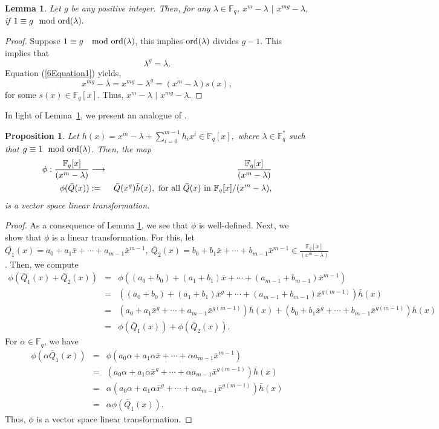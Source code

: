 \documentclass[12pt]{article}
\newtheorem{proposition}{Proposition}
\newtheorem{lemma}{Lemma}
\begin{document}
\begin{lemma}\label{6Lemma1}
	Let $g$ be any positive integer. Then, for any $\lambda \in \mathbb{F}_q$, $x^m- \lambda$ $|$ $x^{mg}-\lambda$, if $1\equiv g\mod \textup{ord}(\lambda).$
\end{lemma}
\begin{proof}
	Suppose $1\equiv g~\mod  \textup{ord}(\lambda)$, this implies $ \textup{ord}(\lambda)$ divides $g-1$. This implies that 
	\begin{equation}\label{6Equation1}
		\lambda^g=\lambda.
	\end{equation}
	Equation (\ref{6Equation1}) yields,
	$$x^{mg}-\lambda=x^{mg}-\lambda^g=(x^m-\lambda)s(x),$$
	for some $s(x)\in \mathbb{F}_q[x].$ Thus, $x^m- \lambda$ $|$ $x^{mg}-\lambda$.
\end{proof}
In light of Lemma~\ref{6Lemma1}, we present an analogue of \cite[Proposition 2]{cauchois2019circulant}.
\begin{proposition}\label{6Proposition1}
	Let $h(x)=x^m-\lambda+\sum_{i=0}^{m-1}h_ix^i\in \mathbb{F}_q[x],$ where $\lambda\in\mathbb{F}^*_q$ such that $g\equiv1\mod \textup{ord}(\lambda)$. Then, the map 
	\begin{eqnarray*}
		\phi:\frac{\mathbb{F}_q[x]}{(x^m-\lambda)} &\longrightarrow& \frac{\mathbb{F}_q[x]}{(x^m-\lambda)}\\		\phi(\bar{Q}(x))&:=&\bar{Q}(x^g)\bar{h}(x),\textup{ for all $\bar{Q}(x)$ in \( \mathbb{F}_q[x]/(x^m - \lambda) \),}
	\end{eqnarray*}
	is a vector space linear transformation.
\end{proposition}
\begin{proof}
	As a consequence of Lemma \ref{6Lemma1}, we see that \( \phi \) is well-defined. Next, we show that \( \phi \) is a linear transformation.
	 For this, let \( \bar{Q_1}(x)=a_0+a_1\bar{x}+\cdots+a_{m-1}\bar{x}^{m-1},~ \bar{Q}_2(x)= b_0+b_1\bar{x}+\cdots+b_{m-1}\bar{x}^{m-1} \in \frac{\mathbb{F}_q[x]}{(x^m - \lambda)} \). Then, we compute
	\begin{eqnarray*}
		\phi(\bar{Q}_1(x)+\bar{Q}_2(x))&=&\phi((a_0+b_0)+(a_1+b_1)\bar{x}+\cdots+(a_{m-1}+b_{m-1})\bar{x}^{m-1})\\
		&=&((a_0+b_0)+(a_1+b_1)\bar{x}^g+\cdots+(a_{m-1}+b_{m-1})\bar{x}^{g(m-1)})\bar{h}(x)\\
		&=&(a_0+a_1\bar{x}^g+\cdots+a_{m-1}\bar{x}^{g(m-1)})\bar{h}(x)+(b_0+b_1\bar{x}^g+\cdots+b_{m-1}\bar{x}^{g(m-1)})\bar{h}(x)\\
		&=&\phi(\bar{Q}_1(x))+\phi(\bar{Q}_2(x)).
	\end{eqnarray*}
	For $\alpha\in \mathbb{F}_q$, we have
	\begin{eqnarray*}
		\phi(\alpha \bar{Q}_1(x))&=&\phi(a_0\alpha+a_1\alpha \bar{x}+\cdots+\alpha a_{m-1}\bar{x}^{m-1})\\
		&=&(a_0\alpha+a_1\alpha \bar{x}^g+\cdots+\alpha a_{m-1}\bar{x}^{g(m-1)})\bar{h}(x)\\
		&=&\alpha(a_0\alpha+a_1\alpha \bar{x}^g+\cdots+\alpha a_{m-1}\bar{x}^{g(m-1)})\bar{h}(x)\\
		&=&\alpha\phi(\bar{Q}_1(x)).
	\end{eqnarray*} 
	Thus, $\phi$ is a vector space linear transformation.
	\end{proof}
\end{document}
